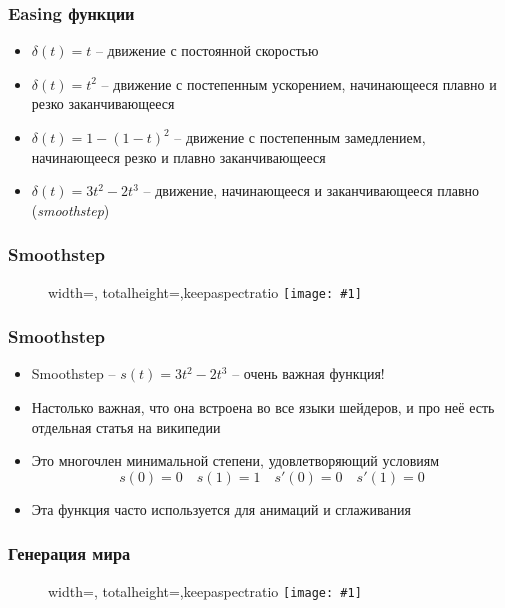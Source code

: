 \documentclass[10pt]{beamer}
\newcommand{\slideimage}[1]{
  \begin{figure}
    \begin{adjustbox}{width=\textwidth, totalheight=\textheight-2\baselineskip-2\baselineskip,keepaspectratio}
      \texttt{[image: \#1]}
    \end{adjustbox}
  \end{figure}
}
\begin{document}
\begin{frame}
\frametitle{Easing функции}
\begin{itemize}
\item \begin{math}\delta(t) = t\end{math} -- движение с постоянной скоростью
\pause
\item \begin{math}\delta(t) = t^2\end{math} -- движение с постепенным ускорением, начинающееся плавно и резко заканчивающееся
\pause
\item \begin{math}\delta(t) = 1-(1-t)^2\end{math} -- движение с постепенным замедлением, начинающееся резко и плавно заканчивающееся
\pause
\item \begin{math}\delta(t) = 3t^2-2t^3\end{math} -- движение, начинающееся и заканчивающееся плавно (\textit{smoothstep})
\end{itemize}
\end{frame}

\begin{frame}
\frametitle{Smoothstep}
\slideimage{smoothstep.png}
\end{frame}

\begin{frame}
\frametitle{Smoothstep}
\begin{itemize}
\item Smoothstep -- \begin{math}s(t) = 3t^2-2t^3\end{math} -- очень важная функция!
\pause
\item Настолько важная, что она встроена во все языки шейдеров, и про неё есть отдельная статья на википедии
\pause
\item Это многочлен минимальной степени, удовлетворяющий условиям
\begin{equation*}
s(0) = 0 \quad s(1) = 1 \quad s'(0) = 0 \quad s'(1) = 0
\end{equation*}
\pause
\item Эта функция часто используется для анимаций и сглаживания
\end{itemize}
\end{frame}

\begin{frame}
\frametitle{Генерация мира}
\slideimage{minecraft.png}
\end{frame}
\end{document}
